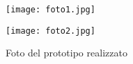 \begin{figure}[H]
    \begin{minipage}{0.40\textwidth}
    \texttt{[image: foto1.jpg]}
    \label{fig:foto1}
    \end{minipage}
    \begin{minipage}{0.57\textwidth}
    \hspace*{0.5cm}\texttt{[image: foto2.jpg]}
    \label{fig:foto2}
    \end{minipage}
    \centering
    \caption[contextmap]{Foto del prototipo realizzato}
\end{figure}